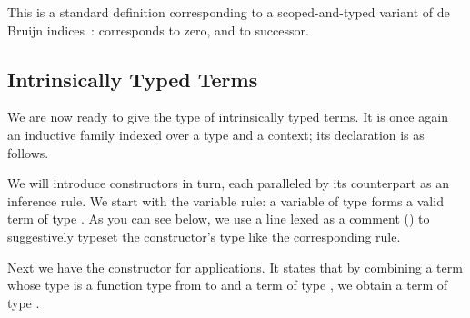 
This is a standard definition
corresponding to a scoped-and-typed variant of de Bruijn
indices~\cite{de1972lambda,DBLP:journals/scp/BellegardeH94,DBLP:conf/csl/AltenkirchR99,DBLP:journals/jfp/BirdP99}:
 corresponds to zero, and  to successor.

\subsection{Intrinsically Typed Terms}

We are now ready to give the type of intrinsically typed terms.
It is once again an inductive family indexed over a type and a
context; its declaration is as follows.


We will introduce constructors in turn, each paralleled by its
counterpart as an inference rule.
%
We start with the variable rule: a variable of type 
forms a valid term of type .
%
As you can see below, we use a line lexed as a comment (\AC{----})
to suggestively typeset the constructor's type like the
corresponding rule.

\noindent
\begin{minipage}[t]{.25\textwidth}
\end{minipage}\hfill
\begin{minipage}[t]{.17\textwidth}
\begin{mathpar}
\end{mathpar}
\end{minipage}

Next we have the constructor for applications. It states that
by combining a term whose type is a function type from  to 
and a term of type , we obtain a term of type .

\noindent
\begin{minipage}[t]{.25\textwidth}
\end{minipage}\hfill
\begin{minipage}[t]{.17\textwidth}
\begin{mathpar}
\end{mathpar}
\end{minipage}


